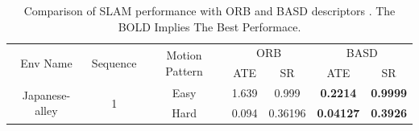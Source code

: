 \documentclass{svproc}
\begin{document}

\begin{table}[h]
\centering
\scriptsize
\caption{Comparison of SLAM performance with ORB and BASD descriptors . The BOLD Implies The Best Performace.}
\label{table_example}
\begin{center}
\begin{tabular}{ccccccc}
\toprule
\midrule
\multirow{2}{*}{Env Name} & \multirow{2}{*}{Sequence}  &\multirow{2}{*}{Motion Pattern} & \multicolumn{2}{c}{ORB} & \multicolumn{2}{c}{BASD}     \\%
  \cline{4-7}%
                                                      & \multicolumn{1}{c}{} & \multicolumn{1}{c}{}    & \multicolumn{1}{c}{ATE} & \multicolumn{1}{c}{SR} & \multicolumn{1}{c}{ATE}  & \multicolumn{1}{c}{SR}\\
  \cline{1-7}

\multirow{8}{*}{Japanese-alley}   &  \multirow{2}{*}{1}   &  \multicolumn{1}{c}{Easy}  & \multicolumn{1}{c}{1.639} & \multicolumn{1}{c}{0.999} & \multicolumn{1}{c}{\textbf{0.2214}}  & \multicolumn{1}{c}{\textbf{0.9999}}   \\
  \cline{3-7}

                                                         & \multicolumn{1}{c}{}  &  \multicolumn{1}{c}{Hard}  & \multicolumn{1}{c}{0.094} & \multicolumn{1}{c}{0.36196} & \multicolumn{1}{c}{\textbf{0.04127} } & \multicolumn{1}{c}{\textbf{0.3926}}   \\
  \cline{2-7}


\end{tabular}
\end{center}
\end{table}
\end{document}
